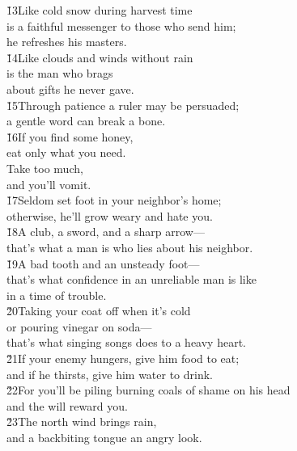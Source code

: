\begin{poetry}
\poeml \v{13}Like cold snow during harvest time \\
\poemll    is a faithful messenger to those who send him; \\
\poemlll       he refreshes his masters. \\
\poeml \v{14}Like clouds and winds without rain \\
\poemll    is the man who brags \\
\poemlll       about gifts he never gave. \\
\poeml \v{15}Through patience a ruler may be persuaded; \\
\poemll    a gentle word can break a bone. \\
\poeml \v{16}If you find some honey, \\
\poemll    eat only what you need. \\
\poeml Take too much, \\
\poemll    and you'll vomit. \\
\poeml \v{17}Seldom set foot in your neighbor's home; \\
\poemll    otherwise, he'll grow weary and hate you. \\
\poeml \v{18}A club, a sword, and a sharp arrow--- \\
\poemll    that's what a man is who lies about his neighbor. \\
\poeml \v{19}A bad tooth and an unsteady foot--- \\
\poemll    that's what confidence in an unreliable man is like \\
\poemlll       in a time of trouble. \\
\poeml \v{20}Taking your coat off when it's cold \\
\poemll    or pouring vinegar on soda--- \\
\poemlll       that's what singing songs does to a heavy heart. \\
\poeml \v{21}If your enemy hungers, give him food to eat; \\
\poemll    and if he thirsts, give him water to drink. \\
\poeml \v{22}For you'll be piling burning coals of shame on his head \\
\poemll    and the  will reward you. \\
\poeml \v{23}The north wind brings rain, \\
\poemll    and a backbiting tongue an angry look. \\

\end{poetry}
